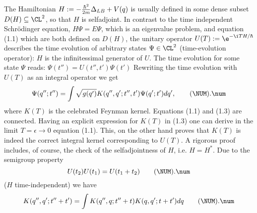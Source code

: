 The Hamiltonian $H:=-{\hbar^2\over2m}\Delta_{LB}+V(q)$ is usually
defined in some dense subset $D(H)\subseteq\CL^2$, so that $H$ is
selfadjoint. In contrast to the time independent Schr\"odinger
equation, $H\Psi=E\Psi$, which is an eigenvalue problem, and equation
(1.1) which are both defined on $D(H)$, the unitary operator
$U(T):=\e^{-\i TH/\hbar}$ describes the time evolution of arbitrary
states $\Psi\in\CL^2$ (time-evolution operator): $H$ is the
infinitessimal generator of $U$. The time evolution for some state
$\Psi$ reads: $\Psi(t'')=U(t'',t')\Psi(t')$ Rewriting the time
evolution with $U(T)$ as an integral operator we get
\plus
$$\Psi(q'';t'')=\int\sqrt{g(q')}K(q'',q';t'',t')\Psi(q';t')dq',
  \tag\NUM.\num$$
where $K(T)$ is the celebrated Feynman kernel. Equations (1.1) and
(1.3) are connected. Having an explicit expression for $K(T)$ in (1.3)
one can derive in the limit $T=\epsilon\to0$ equation (1.1). This, on
the other hand proves that $K(T)$ is indeed the correct integral kernel
corresponding to $U(T)$. A rigorous proof includes, of course, the
check of the selfadjointness of $H$, i.e. $H=H^*$. Due to the semigroup
property
\plus
$$U(t_2)U(t_1)=U(t_1+t_2)
  \tag\NUM.\num$$
($H$ time-independent) we have
\plus
$$K(q'',q';t''+t')=\int K(q'',q;t''+t)K(q,q';t+t')dq
  \tag\NUM.\num$$

